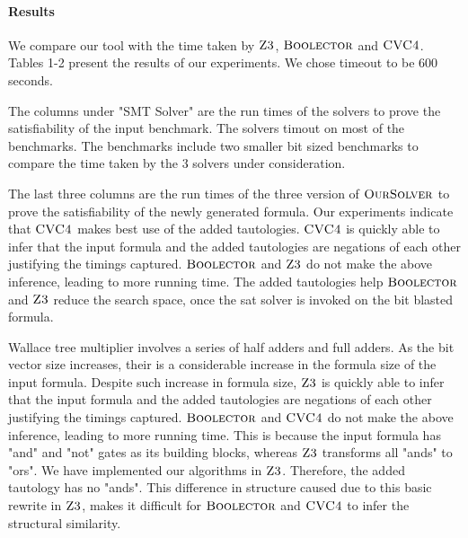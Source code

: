 \paragraph{\bf Results}
%
We compare our tool with the time taken by $\textsc{Z3}$, $\textsc{Boolector}$ and $\textsc{CVC4}$. Tables 1-2 present the results of our experiments. We chose timeout to be 600 seconds.
%



The columns under "SMT Solver" are the run times of the solvers to prove the satisfiability of the input benchmark. The solvers timout on most of the benchmarks. The benchmarks include two smaller bit sized benchmarks to compare the time taken by the 3 solvers under consideration.

The last three columns are the run times of the three  version of $\textsc{OurSolver}$ to prove the satisfiability of the newly generated formula.
%
Our experiments indicate that $\textsc{CVC4}$ makes best use of the added tautologies. $\textsc{CVC4}$ is quickly able to infer that the input formula and the added tautologies are negations of each other justifying the timings captured. 
$\textsc{Boolector}$ and $\textsc{Z3}$ do not make the above inference, leading to more running time. The added tautologies help $\textsc{Boolector}$ and $\textsc{Z3}$ reduce the search space, once the sat solver is invoked on the bit blasted formula.




Wallace tree multiplier involves a series of half adders and full adders. As the bit vector size increases, their is a considerable increase in the formula size of the input formula. Despite such increase in formula size, $\textsc{Z3}$ is quickly able to infer that the input formula and the added tautologies are negations of each other justifying the timings captured. $\textsc{Boolector}$ and $\textsc{CVC4}$ do not make the above inference, leading to more running time. This is because the input formula has "and" and "not" gates as its building blocks, whereas $\textsc{Z3}$ transforms all "ands" to "ors". We have implemented our algorithms in $\textsc{Z3}$. Therefore, the added tautology has no "ands". This difference in structure caused due to this basic rewrite in $\textsc{Z3}$, makes it difficult for $\textsc{Boolector}$ and $\textsc{CVC4}$ to infer the structural similarity. 

